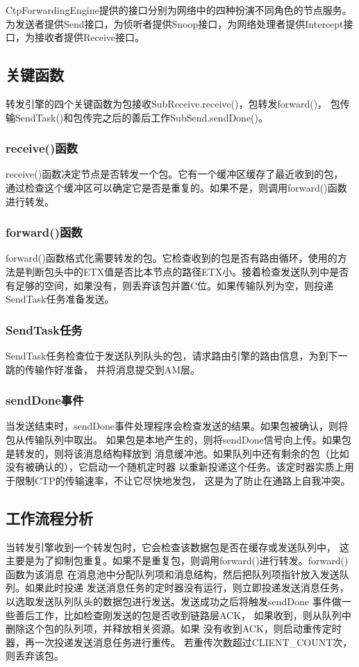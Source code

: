 CtpForwardingEngine提供的接口分别为网络中的四种扮演不同角色的节点服务。为发送者提供Send接口，为侦听者提供Snoop接口，为网络处理者提供Intercept接口，为接收者提供Receive接口。

\subsection{关键函数}
转发引擎的四个关键函数为包接收SubReceive.receive()，包转发forward()，
包传输SendTask()和包传完之后的善后工作SubSend.sendDone()。

\subsubsection{receive()函数}
receive()函数决定节点是否转发一个包。它有一个缓冲区缓存了最近收到的包，
通过检查这个缓冲区可以确定它是否是重复的。如果不是，则调用forward()函数
进行转发。

\subsubsection{forward()函数}
forward()函数格式化需要转发的包。它检查收到的包是否有路由循环，使用的方法是判断包头中的ETX值是否比本节点的路径ETX小。接着检查发送队列中是否有足够的空间，如果没有，则丢弃该包并置C位。如果传输队列为空，则投递SendTask任务准备发送。

\subsubsection{SendTask任务}
SendTask任务检查位于发送队列队头的包，请求路由引擎的路由信息，为到下一跳的传输作好准备，
并将消息提交到AM层。

\subsubsection{sendDone事件}
当发送结束时，sendDone事件处理程序会检查发送的结果。如果包被确认，则将包从传输队列中取出。
如果包是本地产生的，则将sendDone信号向上传。如果包是转发的，则将该消息结构释放到
消息缓冲池。如果队列中还有剩余的包（比如没有被确认的），它启动一个随机定时器
以重新投递这个任务。该定时器实质上用于限制CTP的传输速率，不让它尽快地发包，
这是为了防止在通路上自我冲突。

\subsection{工作流程分析}
当转发引擎收到一个转发包时，它会检查该数据包是否在缓存或发送队列中，
这主要是为了抑制包重复。如果不是重复包，则调用forward()进行转发。forward()函数为该消息
在消息池中分配队列项和消息结构，然后把队列项指针放入发送队列。如果此时投递
发送消息任务的定时器没有运行，则立即投递发送消息任务，
以选取发送队列队头的数据包进行发送。发送成功之后将触发sendDone
事件做一些善后工作，比如检查刚发送的包是否收到链路层ACK，
如果收到，则从队列中删除这个包的队列项，并释放相关资源。如果
没有收到ACK，则启动重传定时器，再一次投递发送消息任务进行重传。
若重传次数超过CLIENT\_COUNT次，则丢弃该包。

